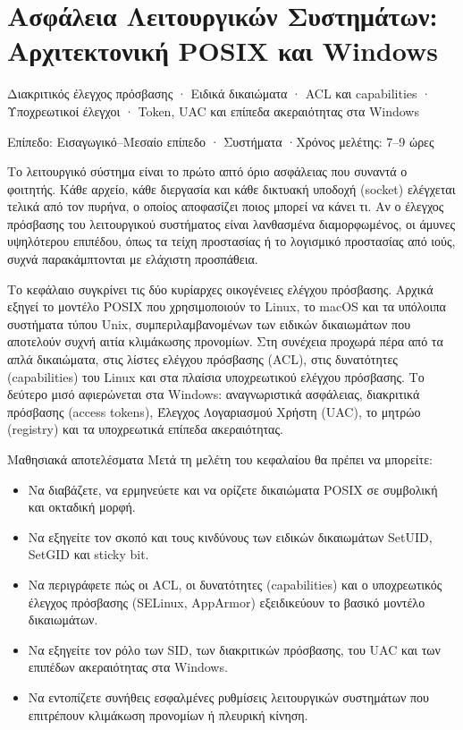\documentclass[11pt,openany]{book}
\newcommand{\chaptermeta}[3]{%
  {\sffamily\small\color{accent}#1\par}\vspace{0.3em}
  {\sffamily\footnotesize\color{gray}#2 \quad·\quad #3\par}\vspace{1.2em}}
\begin{document}
\chapter{Ασφάλεια Λειτουργικών Συστημάτων: Αρχιτεκτονική POSIX και Windows}\label{ch:2}
\chaptermeta{Διακριτικός έλεγχος πρόσβασης · Ειδικά δικαιώματα · ACL και capabilities · Υποχρεωτικοί έλεγχοι · Token, UAC και επίπεδα ακεραιότητας στα Windows}{Επίπεδο: Εισαγωγικό–Μεσαίο επίπεδο · Συστήματα}{Χρόνος μελέτης: 7–9 ώρες}

Το λειτουργικό σύστημα είναι το πρώτο απτό όριο ασφάλειας που συναντά ο φοιτητής. Κάθε αρχείο, κάθε διεργασία και κάθε δικτυακή υποδοχή (socket) ελέγχεται τελικά από τον πυρήνα, ο οποίος αποφασίζει ποιος μπορεί να κάνει τι. Αν ο έλεγχος πρόσβασης του λειτουργικού συστήματος είναι λανθασμένα διαμορφωμένος, οι άμυνες υψηλότερου επιπέδου, όπως τα τείχη προστασίας ή το λογισμικό προστασίας από ιούς, συχνά παρακάμπτονται με ελάχιστη προσπάθεια.

Το κεφάλαιο συγκρίνει τις δύο κυρίαρχες οικογένειες ελέγχου πρόσβασης. Αρχικά εξηγεί το μοντέλο POSIX που χρησιμοποιούν το Linux, το macOS και τα υπόλοιπα συστήματα τύπου Unix, συμπεριλαμβανομένων των ειδικών δικαιωμάτων που αποτελούν συχνή αιτία κλιμάκωσης προνομίων. Στη συνέχεια προχωρά πέρα από τα απλά δικαιώματα, στις λίστες ελέγχου πρόσβασης (ACL), στις δυνατότητες (capabilities) του Linux και στα πλαίσια υποχρεωτικού ελέγχου πρόσβασης. Το δεύτερο μισό αφιερώνεται στα Windows: αναγνωριστικά ασφάλειας, διακριτικά πρόσβασης (access tokens), Έλεγχος Λογαριασμού Χρήστη (UAC), το μητρώο (registry) και τα υποχρεωτικά επίπεδα ακεραιότητας.

\begin{outcomesbox}{Μαθησιακά αποτελέσματα}
Μετά τη μελέτη του κεφαλαίου θα πρέπει να μπορείτε:
\begin{itemize}
  \item Να διαβάζετε, να ερμηνεύετε και να ορίζετε δικαιώματα POSIX σε συμβολική και οκταδική μορφή.
  \item Να εξηγείτε τον σκοπό και τους κινδύνους των ειδικών δικαιωμάτων SetUID, SetGID και sticky bit.
  \item Να περιγράφετε πώς οι ACL, οι δυνατότητες (capabilities) και ο υποχρεωτικός έλεγχος πρόσβασης (SELinux, AppArmor) εξειδικεύουν το βασικό μοντέλο δικαιωμάτων.
  \item Να εξηγείτε τον ρόλο των SID, των διακριτικών πρόσβασης, του UAC και των επιπέδων ακεραιότητας στα Windows.
  \item Να εντοπίζετε συνήθεις εσφαλμένες ρυθμίσεις λειτουργικών συστημάτων που επιτρέπουν κλιμάκωση προνομίων ή πλευρική κίνηση.
\end{itemize}
\end{outcomesbox}
\end{document}
